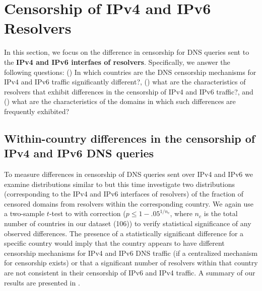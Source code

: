 \section{Censorship of IPv4 and IPv6 Resolvers}
\label{sec:infrastructure}

 In this section, we focus on the difference in censorship
for DNS queries sent to the \textbf{IPv4 and IPv6 interfaes of resolvers}.
%
Specifically, we answer the following questions:
%
() In which countries are the DNS censorship
mechanisms for IPv4 and IPv6 traffic significantly different?,
%
() what are the characteristics of resolvers
that exhibit differences in the censorship of IPv4 and IPv6 traffic?, and
%
() what are the characteristics of the domains
in which such differences are frequently exhibited?

\subsection{Within-country differences in the censorship of IPv4 and IPv6 DNS
queries} \label{sec:infrastructure:country}


%
To measure differences in censorship of DNS queries sent over IPv4 and IPv6 we
examine distributions similar to  but this time
investigate two distributions (corresponding to the IPv4 and IPv6 interfaces of
resolvers) of the fraction of censored domains from resolvers within the
corresponding country.
%
We again use a two-sample $t$-test to with \Sidak correction ($p \leq
1-{.05}^{1/n_{c}}$, where $n_c$ is
the total number of countries in our dataset (106)) to verify statistical
significance of any observed differences.
%
%
The presence of a statistically significant difference for a specific country
would imply that the country appears to have different censorship mechanisms
for IPv4 and IPv6 DNS traffic (if a centralized mechanism for censorship
exists) or that a significant number of resolvers within that country are not
consistent in their censorship of IPv6 and IPv4 traffic.
%
A summary of our results are presented in .

